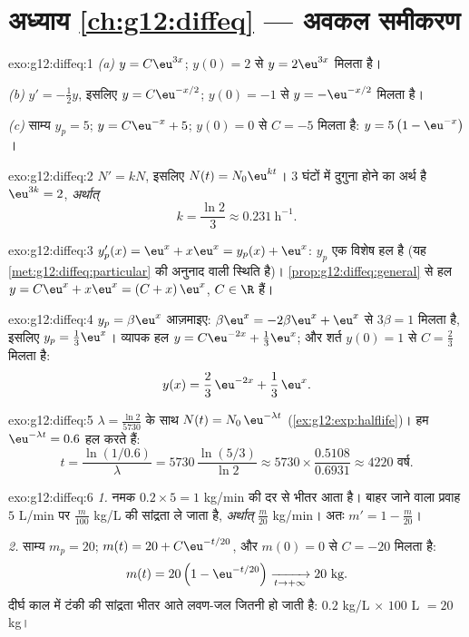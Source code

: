 \section*{अध्याय \ref{ch:g12:diffeq} --- अवकल समीकरण}

\begin{solution}{exo:g12:diffeq:1}
\emph{(a)} $y = C\eu^{3x}$; $y(0) = 2$ से $y = 2\eu^{3x}$ मिलता है।

\emph{(b)} $y' = -\frac12 y$, इसलिए $y = C\eu^{-x/2}$; $y(0) = -1$ से $y = -\eu^{-x/2}$ मिलता है।

\emph{(c)} साम्य $y_p = 5$; $y = C\eu^{-x} + 5$; $y(0) = 0$ से $C = -5$ मिलता है: $y = 5\left(1 - \eu^{-x}\right)$।
\end{solution}

\begin{solution}{exo:g12:diffeq:2}
$N' = kN$, इसलिए $N(t) = N_0 \eu^{kt}$। $3$ घंटों में दुगुना होने का अर्थ है $\eu^{3k} = 2$, \emph{अर्थात्}
\[
k = \frac{\ln 2}{3} \approx 0.231\ \text{h}^{-1}.
\]
\end{solution}

\begin{solution}{exo:g12:diffeq:3}
$y_p'(x) = \eu^x + x\eu^x = y_p(x) + \eu^x$: $y_p$ एक विशेष हल है (यह \cref{met:g12:diffeq:particular} की अनुनाद वाली स्थिति है)। \cref{prop:g12:diffeq:general} से हल $y = C\eu^{x} + x\eu^{x} = (C + x)\,\eu^x$,
$C \in \R$ हैं।
\end{solution}

\begin{solution}{exo:g12:diffeq:4}
$y_p = \beta\eu^x$ आज़माइए: $\beta\eu^x = -2\beta\eu^x + \eu^x$ से $3\beta = 1$ मिलता है, इसलिए $y_p = \frac13\eu^x$। व्यापक हल $y = C\eu^{-2x} + \frac13\eu^{x}$; और शर्त $y(0) = 1$
से $C = \frac23$ मिलता है:
\[
y(x) = \frac{2}{3}\,\eu^{-2x} + \frac{1}{3}\,\eu^{x}.
\]
\end{solution}

\begin{solution}{exo:g12:diffeq:5}
$\lambda = \frac{\ln 2}{5730}$ के साथ $N(t) = N_0\,\eu^{-\lambda t}$ (\cref{ex:g12:exp:halflife})। हम $\eu^{-\lambda t} = 0.6$ हल करते हैं:
\[
t = \frac{\ln(1/0.6)}{\lambda} = 5730\,\frac{\ln(5/3)}{\ln 2}
\approx 5730 \times \frac{0.5108}{0.6931} \approx 4220 \text{ वर्ष}.
\]
\end{solution}

\begin{solution}{exo:g12:diffeq:6}
\emph{1.} नमक $0.2 \times 5 = 1$ kg/min की दर से भीतर आता है। बाहर जाने वाला प्रवाह $5$
L/min पर $\frac{m}{100}$ kg/L की सांद्रता ले जाता है, \emph{अर्थात्} $\frac{m}{20}$ kg/min। अतः
$m' = 1 - \frac{m}{20}$।

\emph{2.} साम्य $m_p = 20$; $m(t) = 20 + C\eu^{-t/20}$, और $m(0) = 0$ से $C = -20$ मिलता है:
\[
m(t) = 20\left(1 - \eu^{-t/20}\right) \xrightarrow[t\to+\infty]{} 20 \text{ kg}.
\]
दीर्घ काल में टंकी की सांद्रता भीतर आते लवण-जल जितनी हो जाती है: $0.2$ kg/L
$\times$ $100$ L $= 20$ kg।
\end{solution}

